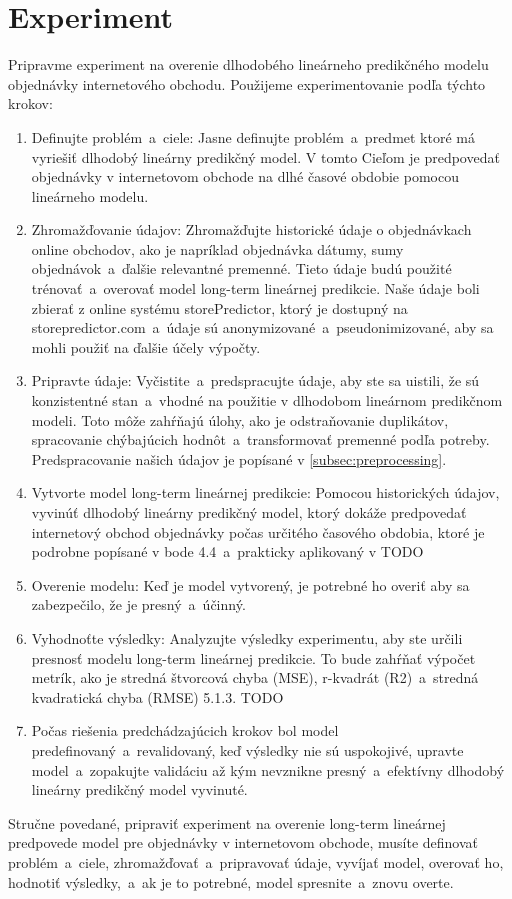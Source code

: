     \section{Experiment}
    Pripravme experiment na overenie dlhodobého lineárneho predikčného modelu objednávky internetového obchodu.
    Použijeme experimentovanie podľa týchto krokov:
    \begin{enumerate}
        \item Definujte problém~a~ciele: Jasne definujte problém~a~predmet ktoré má vyriešiť dlhodobý lineárny
        predikčný model. V tomto Cieľom je predpovedať objednávky v internetovom obchode na dlhé časové obdobie
        pomocou lineárneho modelu.
        \item  Zhromažďovanie údajov: Zhromažďujte historické údaje o objednávkach online obchodov, ako je napríklad
        objednávka dátumy, sumy objednávok~a~ďalšie relevantné premenné. Tieto údaje budú použité trénovať~a~overovať model
        long-term lineárnej predikcie. Naše údaje boli zbierať z online systému storePredictor, ktorý je dostupný na
        storepredictor.com~a~údaje sú anonymizované~a~pseudonimizované, aby sa mohli použiť na ďalšie účely výpočty.
        \item  Pripravte údaje: Vyčistite~a~predspracujte údaje, aby ste sa uistili, že sú konzistentné stan~a~vhodné na
        použitie v dlhodobom lineárnom predikčnom modeli. Toto môže zahŕňajú úlohy, ako je odstraňovanie duplikátov,
        spracovanie chýbajúcich hodnôt~a~transformovať premenné podľa potreby. Predspracovanie našich údajov
        je popísané v \ref{subsec:preprocessing}.
        \item  Vytvorte model long-term lineárnej predikcie: Pomocou historických údajov, vyvinúť dlhodobý lineárny
        predikčný model, ktorý dokáže predpovedať internetový obchod objednávky počas určitého časového obdobia, ktoré
        je podrobne popísané v bode 4.4~a~prakticky aplikovaný v TODO
        \item  Overenie modelu: Keď je model vytvorený, je potrebné ho overiť aby sa zabezpečilo, že je presný~a~účinný.
        \item Vyhodnoťte výsledky: Analyzujte výsledky experimentu, aby ste určili presnosť modelu long-term lineárnej
        predikcie. To bude zahŕňať výpočet metrík, ako je stredná štvorcová chyba (MSE), r-kvadrát (R2)~a~stredná
        kvadratická chyba (RMSE) 5.1.3. TODO
        \item Počas riešenia predchádzajúcich krokov bol model predefinovaný~a~revalidovaný, keď výsledky nie sú uspokojivé,
        upravte model~a~zopakujte validáciu až kým nevznikne presný~a~efektívny dlhodobý lineárny predikčný model vyvinuté.
    \end{enumerate}
    Stručne povedané, pripraviť experiment na overenie long-term lineárnej predpovede model pre objednávky v
    internetovom obchode, musíte definovať problém~a~ciele, zhromažďovať~a~pripravovať údaje, vyvíjať model,
    overovať ho, hodnotiť výsledky,~a~ak je to potrebné, model spresnite~a~znovu overte.
